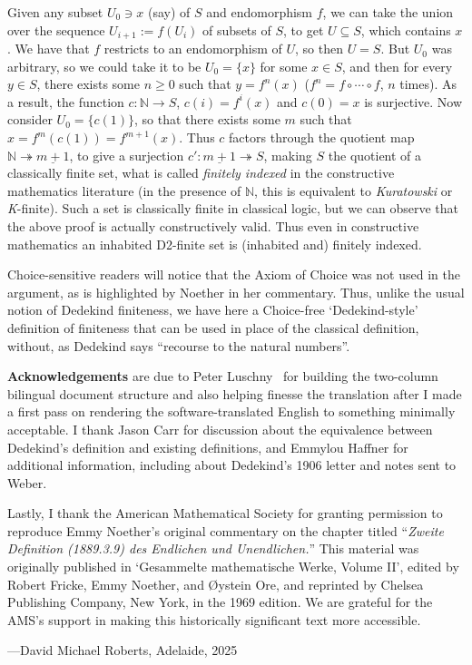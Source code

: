 \documentclass[leqno,hidelinks,10pt]{article}
\theoremstyle{definition}
\begin{document}
Given any subset $U_0\ni x$ (say) of $S$ and endomorphism $f$, we can take the union over the sequence $U_{i+1}:=f(U_i)$ of subsets of $S$, to get $U\subseteq S$, which contains $x$.
We have that $f$ restricts to an endomorphism of $U$, so then $U=S$.
But $U_0$ was arbitrary, so we could take it to be $U_0=\{x\}$ for some $x\in S$, and then for every $y\in S$, there exists some $n \geq 0$ such that $y=f^n(x)$ ($f^n = f\circ \cdots \circ f$, $n$ times).
As a result, the function $c\colon \mathbb{N}\to S$, $c(i) = f^i(x)$ and $c(0)=x$ is surjective.
Now consider $U_0 = \{c(1)\}$, so that there exists some $m$ such that $x=f^m(c(1)) = f^{m+1}(x)$.
Thus $c$ factors through the quotient map $\mathbb{N}\twoheadrightarrow \underline{m+1}$, to give a surjection $c'\colon \underline{m+1}\twoheadrightarrow S$, making $S$ the quotient of a classically finite set, what is called \emph{finitely indexed} in the constructive mathematics literature (in the presence of $\mathbb{N}$, this is equivalent to \emph{Kuratowski} or \emph{K}-finite).
Such a set is classically finite in classical logic, but we can observe that the above proof is actually constructively valid.
Thus even in constructive mathematics an inhabited D2-finite set is (inhabited and) finitely indexed.


Choice-sensitive readers will notice that the Axiom of Choice was not used in the argument, as is highlighted by Noether in her commentary.
Thus, unlike the usual notion of Dedekind finiteness, we have here a Choice-free `Dedekind-style' definition of finiteness that can be used in place of the classical definition, without, as Dedekind says ``recourse to the natural numbers''.



\textbf{Acknowledgements} are due to Peter Luschny~ for building the two-column bilingual document structure and also helping finesse the translation after I made a first pass on rendering the software-translated English to something minimally acceptable.
I thank Jason Carr for discussion about the equivalence between Dedekind's definition and existing definitions, and Emmylou Haffner for additional information, including about Dedekind's 1906 letter and notes sent to Weber.

Lastly, I thank the American Mathematical Society for granting permission to reproduce Emmy Noether’s original commentary on the chapter titled ``\emph{Zweite Definition (1889.3.9) des Endlichen und Unendlichen.}'' This material was originally published in `Gesammelte mathematische Werke, Volume II', edited by Robert Fricke, Emmy Noether, and \O ystein Ore, and reprinted by Chelsea Publishing Company, New York, in the 1969 edition. We are grateful for the AMS’s support in making this historically significant text more accessible.

\bigskip

---David Michael Roberts, Adelaide, 2025



\end{document}
